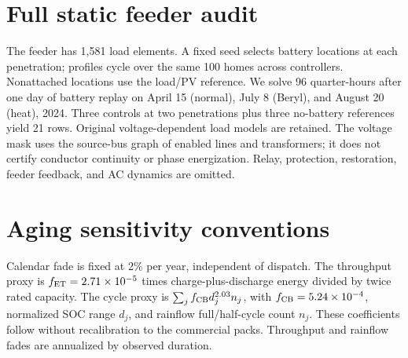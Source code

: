 \section{Full static feeder audit}
\label{app:ac}

The feeder has 1,581 load elements. A fixed seed selects battery locations at each penetration; profiles cycle over the same 100 homes across controllers. Nonattached locations use the load/PV reference. We solve 96 quarter-hours after one day of battery replay on April 15 (normal), July 8 (Beryl), and August 20 (heat), 2024. Three controls at two penetrations plus three no-battery references yield 21 rows. Original voltage-dependent load models are retained. The voltage mask uses the source-bus graph of enabled lines and transformers; it does not certify conductor continuity or phase energization. Relay, protection, restoration, feeder feedback, and AC dynamics are omitted.

\begin{table}[htbp]
\centering\small
\setlength{\tabcolsep}{4pt}

\caption{Full AC audit. Penetration is the percent of load locations assigned battery dispatch. Voltage range is across phase nodes at graph-reachable buses and all intervals, using the mask above. UV/OV are percentages of intervals with any retained phase voltage below 0.95/above 1.05 pu; Line is the percentage with any line current above its nominal ampacity. A small minimum is retained even when the snapshot solver reports convergence. Eighteen phase nodes at unreachable buses have zero voltage and are counted separately in the released CSV. The reference's existing violations prevent treating controller changes as a calibrated grid-compliance assessment.}
\label{tab:ac}
\end{table}
\FloatBarrier

\section{Aging sensitivity conventions}
\label{app:aging}

Calendar fade is fixed at 2\% per year, independent of dispatch. The throughput proxy is $f_{\rm ET}=2.71\times10^{-5}$ times charge-plus-discharge energy divided by twice rated capacity. The cycle proxy is $\sum_j f_{\rm CB}d_j^{2.03}n_j$, with $f_{\rm CB}=5.24\times10^{-4}$, normalized SOC range $d_j$, and rainflow full/half-cycle count $n_j$. These coefficients follow \citet{humiston2026degradation} without recalibration to the commercial packs. Throughput and rainflow fades are annualized by observed duration.

